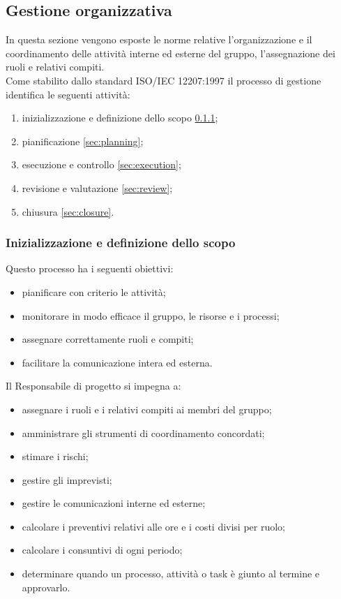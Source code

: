 \subsection{Gestione organizzativa}\label{sec:management_process}
    In questa sezione vengono esposte le norme relative l'organizzazione e il coordinamento delle attività interne ed esterne del gruppo, l'assegnazione dei ruoli e relativi compiti. \\
    Come stabilito dallo standard ISO/IEC 12207:1997 \cite{bib:ISO12207_1997} il processo di gestione identifica le seguenti attività:
    \begin{enumerate}
        \item inizializzazione e definizione dello scopo \ref{sec:scope};
        \item pianificazione \ref{sec:planning};
        \item esecuzione e controllo \ref{sec:execution};
        \item revisione e valutazione \ref{sec:review};
        \item chiusura \ref{sec:closure}.
    \end{enumerate}

    \subsubsection{Inizializzazione e definizione dello scopo}\label{sec:scope}

        Questo processo ha i seguenti obiettivi:
        \begin{itemize}
            \item pianificare con criterio le attività;
            \item monitorare in modo efficace il gruppo, le risorse e i processi;
            \item assegnare correttamente ruoli e compiti;
            \item facilitare la comunicazione intera ed esterna.
        \end{itemize}

        \vspace{0.3cm}
        \noindent
        Il Responsabile di progetto si impegna a:
        \begin{itemize}
            \item assegnare i ruoli e i relativi compiti ai membri del gruppo;
            \item amministrare gli strumenti di coordinamento concordati;
            \item stimare i rischi;
            \item gestire gli imprevisti;
            \item gestire le comunicazioni interne ed esterne;
            \item calcolare i preventivi relativi alle ore e i costi divisi per ruolo;
            \item calcolare i consuntivi di ogni periodo;
            \item determinare quando un processo, attività o task è giunto al termine e approvarlo. 
        \end{itemize}


